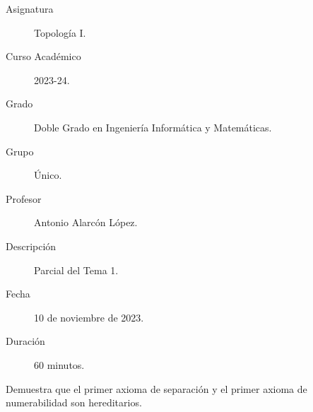 \documentclass[12pt]{article}
\begin{document}

    
    

    \begin{description}
        \item[Asignatura] Topología I.
        \item[Curso Académico] 2023-24.
        \item[Grado] Doble Grado en Ingeniería Informática y Matemáticas.
        \item[Grupo] Único.
        \item[Profesor] Antonio Alarcón López.
        \item[Descripción] Parcial del Tema 1.
        \item[Fecha] 10 de noviembre de 2023.
        \item[Duración] 60 minutos.
    
    \end{description}
    \newpage
    
    \begin{ejercicio}[4 puntos]
        Demuestra que el primer axioma de separación y el primer axioma de numerabilidad son hereditarios.
    \end{ejercicio}
\end{document}
